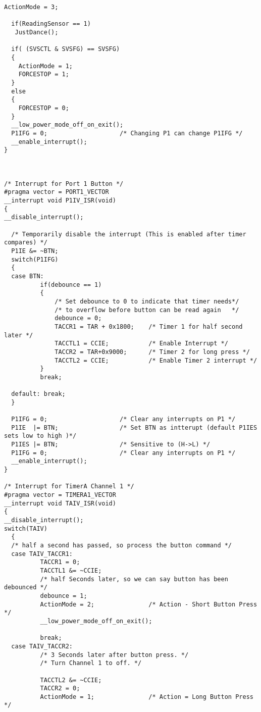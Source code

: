 \begin{lstlisting}[caption=Main.c,label=Code4]
  ActionMode = 3;

  if(ReadingSensor == 1)
   JustDance(); 

  if( (SVSCTL & SVSFG) == SVSFG)
  {
    ActionMode = 1;
    FORCESTOP = 1;
  }
  else
  {
    FORCESTOP = 0;
  }
  __low_power_mode_off_on_exit();
  P1IFG = 0;                    /* Changing P1 can change P1IFG */
  __enable_interrupt();
}



/* Interrupt for Port 1 Button */
#pragma vector = PORT1_VECTOR
__interrupt void P1IV_ISR(void)
{
__disable_interrupt();  
  
  /* Temporarily disable the interrupt (This is enabled after timer compares) */
  P1IE &= ~BTN;                         
  switch(P1IFG)
  {
  case BTN:
          if(debounce == 1)
          {
              /* Set debounce to 0 to indicate that timer needs*/
              /* to overflow before button can be read again   */
              debounce = 0;                     
              TACCR1 = TAR + 0x1800;    /* Timer 1 for half second later */
              TACCTL1 = CCIE;           /* Enable Interrupt */        
              TACCR2 = TAR+0x9000;      /* Timer 2 for long press */
              TACCTL2 = CCIE;           /* Enable Timer 2 interrupt */
          }
          break;
          
  default: break;
  }
  
  P1IFG = 0;                    /* Clear any interrupts on P1 */
  P1IE  |= BTN;                 /* Set BTN as intterupt (default P1IES sets low to high )*/
  P1IES |= BTN;                 /* Sensitive to (H->L) */
  P1IFG = 0;                    /* Clear any interrupts on P1 */
  __enable_interrupt();
}

/* Interrupt for TimerA Channel 1 */
#pragma vector = TIMERA1_VECTOR
__interrupt void TAIV_ISR(void)
{
__disable_interrupt();    
switch(TAIV)
  {
  /* half a second has passed, so process the button command */
  case TAIV_TACCR1:                     
          TACCR1 = 0;
          TACCTL1 &= ~CCIE;
          /* half Seconds later, so we can say button has been debounced */
          debounce = 1;                 
          ActionMode = 2;               /* Action - Short Button Press */ 
          __low_power_mode_off_on_exit();
                 
          break;   
  case TAIV_TACCR2:
          /* 3 Seconds later after button press. */
          /* Turn Channel 1 to off. */
          
          TACCTL2 &= ~CCIE;
          TACCR2 = 0;
          ActionMode = 1;               /* Action = Long Button Press */


\end{lstlisting}
